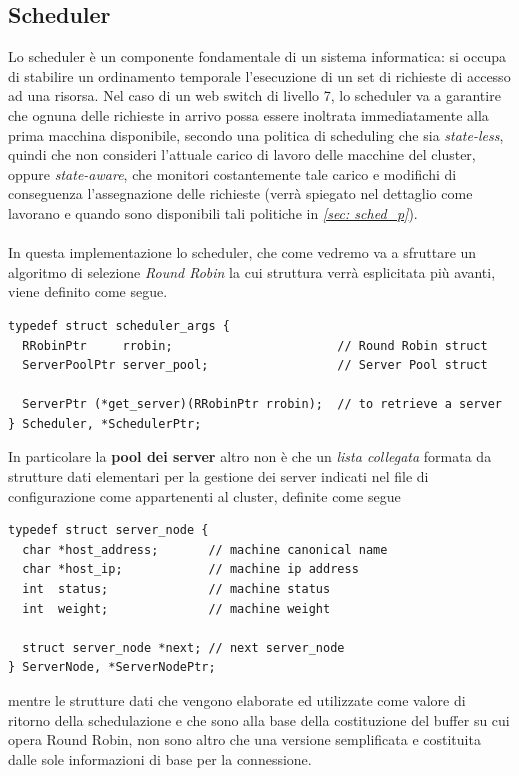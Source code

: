 \documentclass[italian]{tktltiki2}
\begin{document}
\subsection{Scheduler}
\label{ssec: sched}
Lo scheduler è un componente fondamentale di un sistema informatica: si occupa di stabilire un ordinamento temporale l'esecuzione di un set di richieste di accesso ad una risorsa. Nel caso di un web switch di livello 7, lo scheduler va a garantire che ognuna delle richieste in arrivo possa essere inoltrata immediatamente alla prima macchina disponibile, secondo una politica di scheduling che sia \emph{state-less}, quindi che non consideri l'attuale carico di lavoro delle macchine del cluster, oppure \emph{state-aware}, che monitori costantemente tale carico e modifichi di conseguenza l'assegnazione delle richieste (verrà spiegato nel dettaglio come lavorano e quando sono disponibili tali politiche in \emph{\ref{sec: sched_p}}). 
\\
\\
In questa implementazione lo scheduler, che come vedremo va a sfruttare un algoritmo di selezione \emph{Round Robin} la cui struttura verrà esplicitata più avanti, viene definito come segue.
\begin{lstlisting}
typedef struct scheduler_args {
  RRobinPtr     rrobin;                       // Round Robin struct
  ServerPoolPtr server_pool;                  // Server Pool struct

  ServerPtr (*get_server)(RRobinPtr rrobin);  // to retrieve a server
} Scheduler, *SchedulerPtr;
\end{lstlisting}
In particolare la \textbf{pool dei server} altro non è che un \emph{lista collegata} formata da strutture dati elementari per la gestione dei server indicati nel file di configurazione come appartenenti al cluster, definite come segue
\begin{lstlisting}
typedef struct server_node {
  char *host_address;       // machine canonical name
  char *host_ip;            // machine ip address
  int  status;              // machine status
  int  weight;              // machine weight

  struct server_node *next; // next server_node
} ServerNode, *ServerNodePtr;
\end{lstlisting}
mentre le strutture dati che vengono elaborate ed utilizzate come valore di ritorno della schedulazione e che sono alla base della costituzione del buffer su cui opera Round Robin, non sono altro che una versione semplificata e costituita dalle sole informazioni di base per la connessione. 
\end{document}
